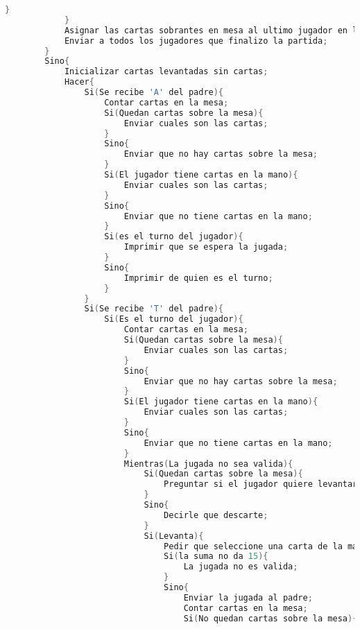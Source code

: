 \begin{lstlisting}[language=C]
                }
            }
            Asignar las cartas sobrantes en mesa al ultimo jugador en levantar;
            Enviar a todos los jugadores que finalizo la partida;
        }
        Sino{
            Inicializar cartas levantadas sin cartas;
            Hacer{
                Si(Se recibe 'A' del padre){
                    Contar cartas en la mesa;
                    Si(Quedan cartas sobre la mesa){
                        Enviar cuales son las cartas;
                    }
                    Sino{
                        Enviar que no hay cartas sobre la mesa;
                    }
                    Si(El jugador tiene cartas en la mano){
                        Enviar cuales son las cartas;
                    }
                    Sino{
                        Enviar que no tiene cartas en la mano;
                    }
                    Si(es el turno del jugador){
                        Imprimir que se espera la jugada;
                    }
                    Sino{
                        Imprimir de quien es el turno;
                    }
                }
                Si(Se recibe 'T' del padre){
                    Si(Es el turno del jugador){
                        Contar cartas en la mesa;
                        Si(Quedan cartas sobre la mesa){
                            Enviar cuales son las cartas;
                        }
                        Sino{
                            Enviar que no hay cartas sobre la mesa;
                        }
                        Si(El jugador tiene cartas en la mano){
                            Enviar cuales son las cartas;
                        }
                        Sino{
                            Enviar que no tiene cartas en la mano;
                        }
                        Mientras(La jugada no sea valida){
                            Si(Quedan cartas sobre la mesa){
                                Preguntar si el jugador quiere levantar o descartar;
                            }
                            Sino{
                                Decirle que descarte;
                            }
                            Si(Levanta){
                                Pedir que seleccione una carta de la mano y las correspondientes de la mesa;
                                Si(la suma no da 15){
                                    La jugada no es valida;
                                }
                                Sino{
                                    Enviar la jugada al padre;
                                    Contar cartas en la mesa;
                                    Si(No quedan cartas sobre la mesa){

\end{lstlisting}

